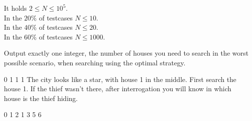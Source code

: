\smallskip
\noindent
It holds $2 \leq N \leq 10^5$.\\
In the $20\%$ of testcases $N \leq 10$.\\
In the $40\%$ of testcases $N \leq 20$.\\
In the $60\%$ of testcases $N \leq 1000$.


Output exactly one integer, the number of houses you need to search in the worst possible scenario,
when searching using the optimal strategy.



0 1 1 1
\sampleCOMMENT
The city looks like a star, with house 1 in the middle.
\sampleCOMMENT
First search the house 1.
If the thief wasn't there, after interrogation you will know in which house is the thief hiding.
\sampleEND


\bigskip


0 1 2 1 3 5 6
\sampleEND



